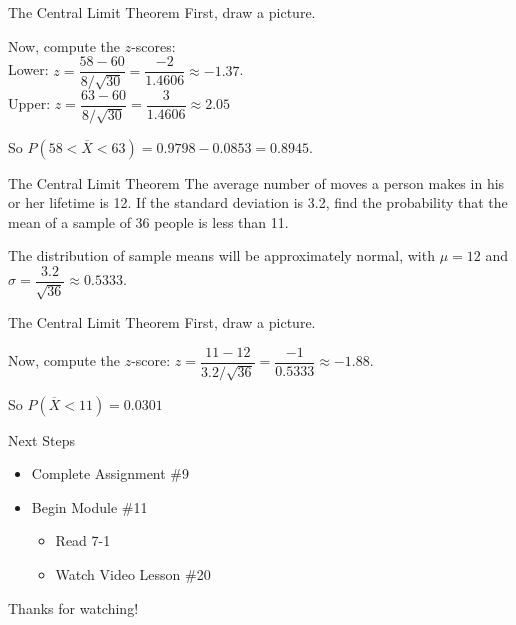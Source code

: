 \documentclass[t, aspectratio=169]{beamer}
\newcommand{\?}{\stackrel{?}{=}}
\begin{document}
	\begin{frame}{The Central Limit Theorem}
		First, draw a picture. \vspace{1in} \pause
		
		Now, compute the $z$-scores: \\
		Lower: $z = \dfrac{58 - 60}{8 / \sqrt{30}} = \dfrac{-2}{1.4606} \approx -1.37$. \pause \\
		Upper: $z = \dfrac{63 - 60}{8 / \sqrt{30}} = \dfrac{3}{1.4606} \approx 2.05$ \pause
		
		So $P(58 < \overline{X} < 63) = 0.9798 - 0.0853 = 0.8945$.
	\end{frame}

	\begin{frame}{The Central Limit Theorem}
		The average number of moves a person makes in his or her lifetime is 12. If the standard deviation is 3.2, find the probability that the mean of a sample of 36 people is less than 11. \pause
		
		The distribution of sample means will be approximately normal, with $\mu = 12$ and $\sigma = \dfrac{3.2}{\sqrt{36}} \approx 0.5333$.
	\end{frame}

	\begin{frame}{The Central Limit Theorem}
		First, draw a picture. \pause \vspace{1in}
		
		Now, compute the $z$-score: $z = \dfrac{11 - 12}{3.2 / \sqrt{36}} = \dfrac{-1}{0.5333} \approx -1.88$. \pause
		
		So $P(\overline{X} < 11) = 0.0301$
	\end{frame}

	\begin{frame}{Next Steps}
		\begin{itemize}
			\item Complete Assignment \#9
			\item Begin Module \#11 \begin{itemize}
				\item Read 7-1
				\item Watch Video Lesson \#20
			\end{itemize}
		\end{itemize}
		
		\vfill
		
		Thanks for watching!
	\end{frame}
	
\end{document}
